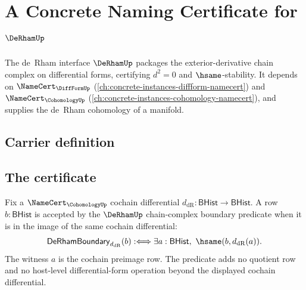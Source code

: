 \chapter{A Concrete Naming Certificate for $\DeRhamUp$}
\label{ch:concrete-instances-derham-namecert}

The de~Rham interface $\DeRhamUp$ packages the exterior-derivative chain complex on differential forms, certifying $d^2 = 0$ and $\hsame$-stability. It depends on $\NameCert_{\DiffFormUp}$ (\autoref{ch:concrete-instances-diffform-namecert}) and $\NameCert_{\CohomologyUp}$ (\autoref{ch:concrete-instances-cohomology-namecert}), and supplies the de~Rham cohomology of a manifold.

\section{Carrier definition}
\label{sec:deRham-carrier}

\section{The certificate}
\label{sec:deRham-certificate}

\begin{definition}
\label{def:derham-chain-complex-boundary-row}
Fix a $\NameCert_{\CohomologyUp}$ cochain differential
$d_{\mathrm{dR}}:\mathsf{BHist}\to\mathsf{BHist}$. A row
$b:\mathsf{BHist}$ is accepted by the $\DeRhamUp$ chain-complex boundary
predicate when it is in the image of the same cochain differential:
$$
\mathsf{DeRhamBoundary}_{d_{\mathrm{dR}}}(b)
:\Longleftrightarrow
\exists a:\mathsf{BHist},\ \hsame(b,d_{\mathrm{dR}}(a)).
$$
The witness $a$ is the cochain preimage row. The predicate adds no quotient
row and no host-level differential-form operation beyond the displayed
cochain differential.
\end{definition}

